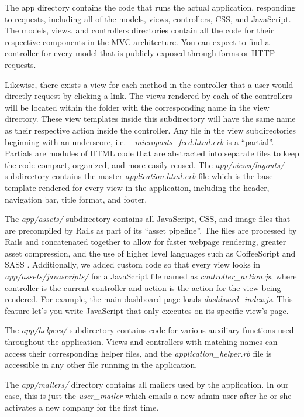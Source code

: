 \documentclass[12pt,letterpaper,titlepage]{article}
\begin{document}
The app directory contains the code that runs the actual application, responding to requests, including all of the models, views, controllers, CSS, and JavaScript. The models, views, and controllers directories contain all the code for their respective components in the MVC architecture. You can expect to find a controller for every model that is publicly exposed through forms or HTTP requests.

Likewise, there exists a view for each method in the controller that a user would directly request by clicking a link. The views rendered by each of the controllers will be located within the folder with the corresponding name in the view directory. These view templates inside this subdirectory will have the same name as their respective action inside the controller. Any file in the view subdirectories beginning with an underscore, i.e. \textit{\_microposts\_feed.html.erb} is a ``partial''. Partials are modules of HTML code that are abstracted into separate files to keep the code compact, organized, and more easily reused. The \textit{app/views/layouts/} subdirectory contains the master \textit{application.html.erb} file which is the base template rendered for every view in the application, including the header, navigation bar, title format, and footer.

The \textit{app/assets/} subdirectory contains all JavaScript, CSS, and image files that are precompiled by Rails as part of its ``asset pipeline''. The files are processed by Rails and concatenated together to allow for faster webpage rendering, greater asset compression, and the use of higher level languages such as CoffeeScript and SASS \cite{rails asset guide}. Additionally, we added custom code so that every view looks in \textit{app/assets/javascripts/} for a JavaScript file named as \textit{controller\_action.js}, where controller is the current controller and action is the action for the view being rendered. For example, the main dashboard page loads \textit{dashboard\_index.js}. This feature let’s you write JavaScript that only executes on its specific view's page.

The \textit{app/helpers/} subdirectory contains code for various auxiliary functions used throughout the application. Views and controllers with matching names can access their corresponding helper files, and the \textit{application\_helper.rb} file is accessible in any other file running in the application. 

The \textit{app/mailers/} directory contains all mailers used by the application. In our case, this is just the \textit{user\_mailer} which emails a new admin user after he or she activates a new company for the first time.
\end{document}
